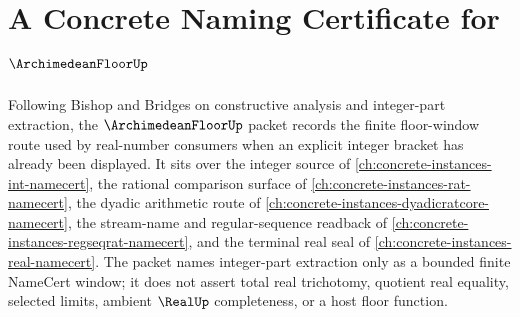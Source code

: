 \chapter{A Concrete Naming Certificate for $\ArchimedeanFloorUp$}
\label{ch:concrete-instances-archimedean-floor-namecert}

Following Bishop and Bridges on constructive analysis and integer-part extraction, the $\ArchimedeanFloorUp$ packet records the finite floor-window route used by real-number consumers when an explicit integer bracket has already been displayed. It sits over the integer source of \autoref{ch:concrete-instances-int-namecert}, the rational comparison surface of \autoref{ch:concrete-instances-rat-namecert}, the dyadic arithmetic route of \autoref{ch:concrete-instances-dyadicratcore-namecert}, the stream-name and regular-sequence readback of \autoref{ch:concrete-instances-regseqrat-namecert}, and the terminal real seal of \autoref{ch:concrete-instances-real-namecert}. The packet names integer-part extraction only as a bounded finite NameCert window; it does not assert total real trichotomy, quotient real equality, selected limits, ambient $\RealUp$ completeness, or a host floor function.

